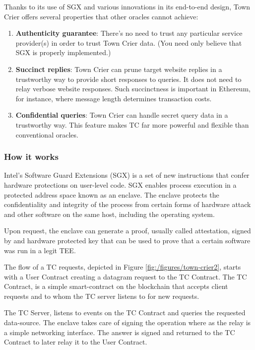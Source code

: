 Thanks to its use of SGX and various innovations in its end-to-end design, Town Crier offers several properties that other oracles cannot achieve:

\begin{enumerate}
    \item \textbf{Authenticity guarantee}: There's no need to trust any particular service provider(s) in order to trust Town Crier data. (You need only believe that SGX is properly implemented.)
    \item \textbf{Succinct replies}: Town Crier can prune target website replies in a trustworthy way to provide short responses to queries. It does not need to relay verbose website responses. Such succinctness is important in Ethereum, for instance, where message length determines transaction costs.
    \item \textbf{Confidential queries}: Town Crier can handle secret query data in a trustworthy way. This feature makes TC far more powerful and flexible than conventional oracles.
\end{enumerate}

\subsubsection{How it works}

Intel’s Software Guard Extensions (SGX) is a set of new instructions that confer hardware protections on user-level code. SGX enables process execution in a protected address space known as an enclave. The enclave protects the confidentiality and integrity of the process from certain forms of hardware attack and other software on the same host, including the operating system.

Upon request, the enclave can generate a proof, usually called attestation, signed by and hardware protected key that can be used to prove that a certain software was run in a legit TEE.

The flow of a TC requests, depicted in Figure \ref{fig:/figures/town-crier2}, starts with a User Contract creating a datagram request to the TC Contract. The TC Contract, is a simple smart-contract on the blockchain that accepts client requests and to whom the TC server listens to for new requests.

The TC Server, listens to events on the TC Contract and queries the requested data-source. The enclave takes care of signing the operation where as the relay is a simple networking interface. The answer is signed and returned to the TC Contract to later relay it to the User Contract.


